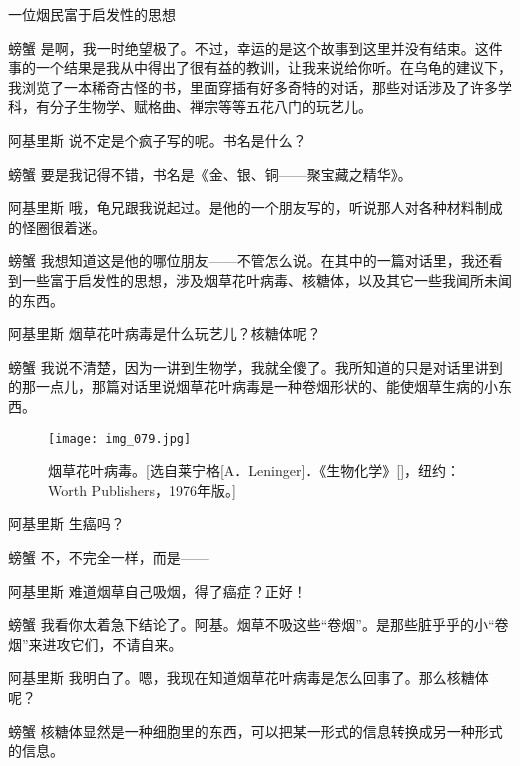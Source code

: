 \begin{dialog}{一位烟民富于启发性的思想}
\begin{dialogue}
\item[螃蟹]是啊，我一时绝望极了。不过，幸运的是这个故事到这里并没有结束。这件事的一个结果是我从中得出了很有益的教训，让我来说给你听。在乌龟的建议下，我浏览了一本稀奇古怪的书，里面穿插有好多奇特的对话，那些对话涉及了许多学科，有分子生物学、赋格曲、禅宗等等五花八门的玩艺儿。

\item[阿基里斯]说不定是个疯子写的呢。书名是什么？

\item[螃蟹]要是我记得不错，书名是《金、银、铜——聚宝藏之精华》。

\item[阿基里斯]哦，龟兄跟我说起过。是他的一个朋友写的，听说那人对各种材料制成的怪圈很着迷。

\item[螃蟹]我想知道这是他的哪位朋友——不管怎么说。在其中的一篇对话里，我还看到一些富于启发性的思想，涉及烟草花叶病毒、核糖体，以及其它一些我闻所未闻的东西。

\item[阿基里斯]烟草花叶病毒是什么玩艺儿？核糖体呢？

\item[螃蟹]我说不清楚，因为一讲到生物学，我就全傻了。我所知道的只是对话里讲到的那一点儿，那篇对话里说烟草花叶病毒是一种卷烟形状的、能使烟草生病的小东西。

\begin{figure}
\texttt{[image: img\_079.jpg]}
\caption[烟草花叶病毒。]
  {烟草花叶病毒。[选自莱宁格[A．Leninger]．《生物化学》[]，纽约：Worth Publishers，1976年版。] }
\end{figure}

\item[阿基里斯]生癌吗？

\item[螃蟹]不，不完全一样，而是——

\item[阿基里斯]难道烟草自己吸烟，得了癌症？正好！

\item[螃蟹]我看你太着急下结论了。阿基。烟草不吸这些“卷烟”。是那些脏乎乎的小“卷烟”来进攻它们，不请自来。

\item[阿基里斯]我明白了。嗯，我现在知道烟草花叶病毒是怎么回事了。那么核糖体呢？

\item[螃蟹]核糖体显然是一种细胞里的东西，可以把某一形式的信息转换成另一种形式的信息。


\end{dialogue}
\end{dialog}
